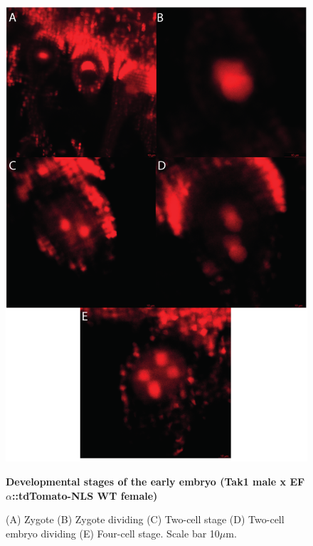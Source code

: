 \begin{figure}[htbp!] 
\centering    
    \includegraphics[width=1\textwidth]{Chapter3/Figs/Figure5_Developmental_stages.pdf}
\caption{\textbf{Developmental stages of the early embryo (Tak1 male x EF$\alpha$::tdTomato-NLS WT female)}}
\label{fig:dev_stages}
\captionsetup{font=small}
    \caption*{(A) Zygote (B) Zygote dividing (C) Two-cell stage (D) Two-cell embryo dividing (E) Four-cell stage. Scale bar 10$\mu$m.}
\end{figure}


